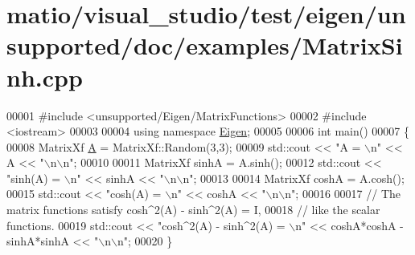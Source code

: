 \hypertarget{matio_2visual__studio_2test_2eigen_2unsupported_2doc_2examples_2_matrix_sinh_8cpp_source}{}\section{matio/visual\+\_\+studio/test/eigen/unsupported/doc/examples/\+Matrix\+Sinh.cpp}
\label{matio_2visual__studio_2test_2eigen_2unsupported_2doc_2examples_2_matrix_sinh_8cpp_source}

\begin{DoxyCode}
00001 \textcolor{preprocessor}{#include <unsupported/Eigen/MatrixFunctions>}
00002 \textcolor{preprocessor}{#include <iostream>}
00003 
00004 \textcolor{keyword}{using namespace }\hyperlink{namespace_eigen}{Eigen};
00005 
00006 \textcolor{keywordtype}{int} main()
00007 \{
00008   MatrixXf \hyperlink{group___core___module_class_eigen_1_1_matrix}{A} = MatrixXf::Random(3,3);
00009   std::cout << \textcolor{stringliteral}{"A = \(\backslash\)n"} << A << \textcolor{stringliteral}{"\(\backslash\)n\(\backslash\)n"};
00010 
00011   MatrixXf sinhA = A.sinh();
00012   std::cout << \textcolor{stringliteral}{"sinh(A) = \(\backslash\)n"} << sinhA << \textcolor{stringliteral}{"\(\backslash\)n\(\backslash\)n"};
00013 
00014   MatrixXf coshA = A.cosh();
00015   std::cout << \textcolor{stringliteral}{"cosh(A) = \(\backslash\)n"} << coshA << \textcolor{stringliteral}{"\(\backslash\)n\(\backslash\)n"};
00016   
00017   \textcolor{comment}{// The matrix functions satisfy cosh^2(A) - sinh^2(A) = I, }
00018   \textcolor{comment}{// like the scalar functions.}
00019   std::cout << \textcolor{stringliteral}{"cosh^2(A) - sinh^2(A) = \(\backslash\)n"} << coshA*coshA - sinhA*sinhA << \textcolor{stringliteral}{"\(\backslash\)n\(\backslash\)n"};
00020 \}
\end{DoxyCode}
